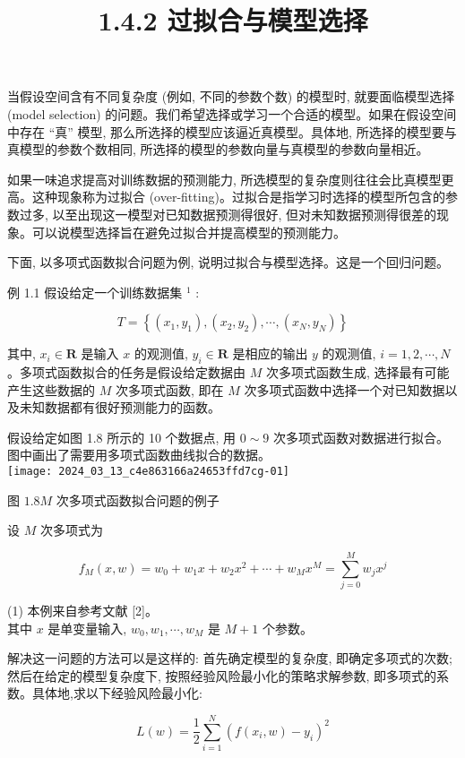 \documentclass[10pt]{article}
\title{1.4.2 过拟合与模型选择 }
\author{}
\date{}
\begin{document}
\maketitle
当假设空间含有不同复杂度 (例如, 不同的参数个数) 的模型时, 就要面临模型选择 (model selection) 的问题。我们希望选择或学习一个合适的模型。如果在假设空间中存在 “真” 模型, 那么所选择的模型应该逼近真模型。具体地, 所选择的模型要与真模型的参数个数相同, 所选择的模型的参数向量与真模型的参数向量相近。

如果一味追求提高对训练数据的预测能力, 所选模型的复杂度则往往会比真模型更高。这种现象称为过拟合 (over-fitting)。过拟合是指学习时选择的模型所包含的参数过多, 以至出现这一模型对已知数据预测得很好, 但对未知数据预测得很差的现象。可以说模型选择旨在避免过拟合并提高模型的预测能力。

下面, 以多项式函数拟合问题为例, 说明过拟合与模型选择。这是一个回归问题。

例 1.1 假设给定一个训练数据集 ${ }^{1}$ :

$$
T=\left\{\left(x_{1}, y_{1}\right),\left(x_{2}, y_{2}\right), \cdots,\left(x_{N}, y_{N}\right)\right\}
$$

其中, $x_{i} \in \boldsymbol{R}$ 是输入 $x$ 的观测值, $y_{i} \in \boldsymbol{R}$ 是相应的输出 $y$ 的观测值, $i=1,2, \cdots, N$ 。多项式函数拟合的任务是假设给定数据由 $M$ 次多项式函数生成, 选择最有可能产生这些数据的 $M$ 次多项式函数, 即在 $M$ 次多项式函数中选择一个对已知数据以及未知数据都有很好预测能力的函数。

假设给定如图 1.8 所示的 10 个数据点, 用 $0 \sim 9$ 次多项式函数对数据进行拟合。图中画出了需要用多项式函数曲线拟合的数据。\\
\texttt{[image: 2024\_03\_13\_c4e863166a24653ffd7cg-01]}

图 $1.8 M$ 次多项式函数拟合问题的例子

设 $M$ 次多项式为


\begin{equation*}
f_{M}(x, w)=w_{0}+w_{1} x+w_{2} x^{2}+\cdots+w_{M} x^{M}=\sum_{j=0}^{M} w_{j} x^{j} \tag{1.22}
\end{equation*}


(1) 本例来自参考文献 [2]。\\
其中 $x$ 是单变量输入, $w_{0}, w_{1}, \cdots, w_{M}$ 是 $M+1$ 个参数。

解决这一问题的方法可以是这样的: 首先确定模型的复杂度, 即确定多项式的次数; 然后在给定的模型复杂度下, 按照经验风险最小化的策略求解参数, 即多项式的系数。具体地,求以下经验风险最小化:


\begin{equation*}
L(w)=\frac{1}{2} \sum_{i=1}^{N}\left(f\left(x_{i}, w\right)-y_{i}\right)^{2} \tag{1.23}
\end{equation*}
\end{document}

